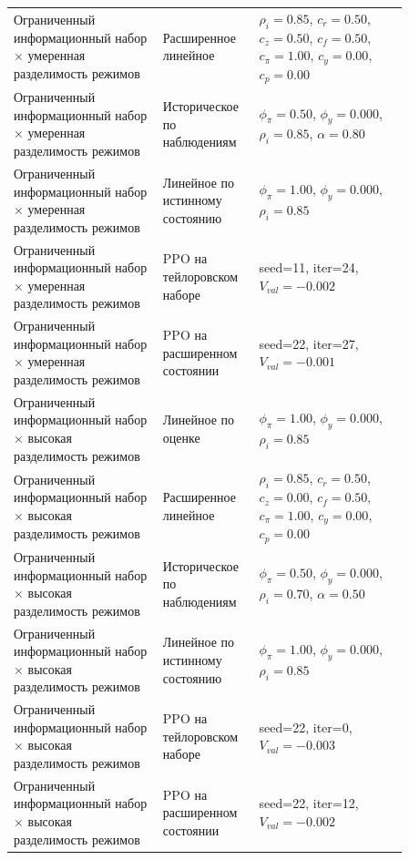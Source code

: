 \begin{tabular}{p{0.34\linewidth}p{0.18\linewidth}p{0.34\linewidth}}
Ограниченный информационный набор × умеренная разделимость режимов & Расширенное линейное & $\rho_i=0.85$, $c_r=0.50$, $c_z=0.50$, $c_f=0.50$, $c_\pi=1.00$, $c_y=0.00$, $c_p=0.00$ \\
Ограниченный информационный набор × умеренная разделимость режимов & Историческое по наблюдениям & $\phi_\pi=0.50$, $\phi_y=0.000$, $\rho_i=0.85$, $\alpha=0.80$ \\
Ограниченный информационный набор × умеренная разделимость режимов & Линейное по истинному состоянию & $\phi_\pi=1.00$, $\phi_y=0.000$, $\rho_i=0.85$ \\
Ограниченный информационный набор × умеренная разделимость режимов & PPO на тейлоровском наборе & seed=11, iter=24, $V_{val}=-0.002$ \\
Ограниченный информационный набор × умеренная разделимость режимов & PPO на расширенном состоянии & seed=22, iter=27, $V_{val}=-0.001$ \\
Ограниченный информационный набор × высокая разделимость режимов & Линейное по оценке & $\phi_\pi=1.00$, $\phi_y=0.000$, $\rho_i=0.85$ \\
Ограниченный информационный набор × высокая разделимость режимов & Расширенное линейное & $\rho_i=0.85$, $c_r=0.50$, $c_z=0.00$, $c_f=0.50$, $c_\pi=1.00$, $c_y=0.00$, $c_p=0.00$ \\
Ограниченный информационный набор × высокая разделимость режимов & Историческое по наблюдениям & $\phi_\pi=0.50$, $\phi_y=0.000$, $\rho_i=0.70$, $\alpha=0.50$ \\
Ограниченный информационный набор × высокая разделимость режимов & Линейное по истинному состоянию & $\phi_\pi=1.00$, $\phi_y=0.000$, $\rho_i=0.85$ \\
Ограниченный информационный набор × высокая разделимость режимов & PPO на тейлоровском наборе & seed=22, iter=0, $V_{val}=-0.003$ \\
Ограниченный информационный набор × высокая разделимость режимов & PPO на расширенном состоянии & seed=22, iter=12, $V_{val}=-0.002$ \\
\bottomrule
\end{tabular}